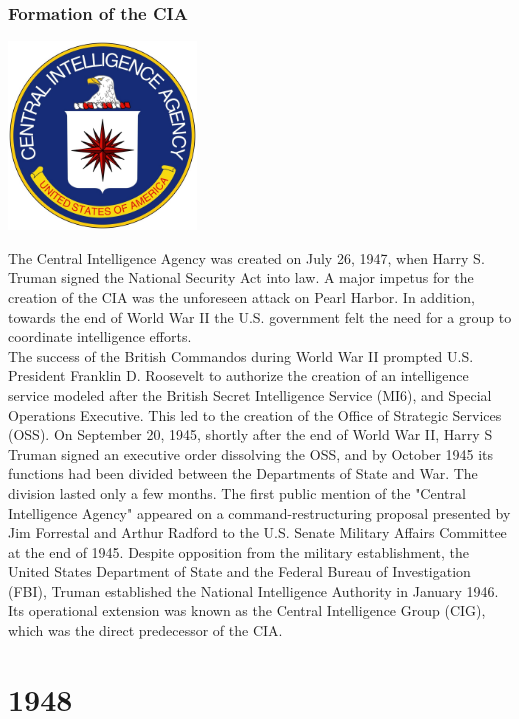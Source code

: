 \documentclass[11pt]{report}
\begin{document}
\subsection{Formation of the CIA}
\vspace{2mm}\begin{center}\includegraphics[width=5cm]{./img/CIALogo.jpg}\end{center}
The Central Intelligence Agency was created on July 26, 1947, when Harry S. Truman signed the National Security Act into law. A major impetus for the creation of the CIA was the unforeseen attack on Pearl Harbor. In addition, towards the end of World War II the U.S. government felt the need for a group to coordinate intelligence efforts.\\
\indent The success of the British Commandos during World War II prompted U.S. President Franklin D. Roosevelt to authorize the creation of an intelligence service modeled after the British Secret Intelligence Service (MI6), and Special Operations Executive. This led to the creation of the Office of Strategic Services (OSS). On September 20, 1945, shortly after the end of World War II, Harry S Truman signed an executive order dissolving the OSS, and by October 1945 its functions had been divided between the Departments of State and War. The division lasted only a few months. The first public mention of the "Central Intelligence Agency" appeared on a command-restructuring proposal presented by Jim Forrestal and Arthur Radford to the U.S. Senate Military Affairs Committee at the end of 1945. Despite opposition from the military establishment, the United States Department of State and the Federal Bureau of Investigation (FBI), Truman established the National Intelligence Authority in January 1946. Its operational extension was known as the Central Intelligence Group (CIG), which was the direct predecessor of the CIA.

\chapter{1948}
\end{document}
